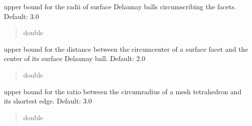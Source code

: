 \documentclass[letterpaper,10pt,english]{sphinxmanual}
\begin{document}
\begin{fulllineitems}
\begin{fulllineitems}
\begin{quote}
\begin{description}
\end{description}\end{quote}

\end{fulllineitems}


\begin{fulllineitems}
\label{\detokenize{_autosummary/nirfasterff.utils.MeshingParams:nirfasterff.utils.MeshingParams.facet_size}}
\pysigstartsignatures
{}
\pysigstopsignatures
\sphinxAtStartPar
upper bound for the radii of surface Delaunay balls circumscribing the facets. Default: 3.0
\begin{quote}\begin{description}
\sphinxAtStartPar
double

\end{description}\end{quote}

\end{fulllineitems}


\begin{fulllineitems}
\label{\detokenize{_autosummary/nirfasterff.utils.MeshingParams:nirfasterff.utils.MeshingParams.facet_distance}}
\pysigstartsignatures
{}
\pysigstopsignatures
\sphinxAtStartPar
upper bound for the distance between the circumcenter of a surface facet and the center of its surface Delaunay ball. Default: 2.0
\begin{quote}\begin{description}
\sphinxAtStartPar
double

\end{description}\end{quote}

\end{fulllineitems}


\begin{fulllineitems}
\label{\detokenize{_autosummary/nirfasterff.utils.MeshingParams:nirfasterff.utils.MeshingParams.cell_radius_edge}}
\pysigstartsignatures
{}
\pysigstopsignatures
\sphinxAtStartPar
upper bound for the ratio between the circumradius of a mesh tetrahedron and its shortest edge. Default: 3.0
\begin{quote}\begin{description}
\sphinxAtStartPar
double


\end{description}
\end{quote}
\end{fulllineitems}
\end{fulllineitems}
\end{document}
